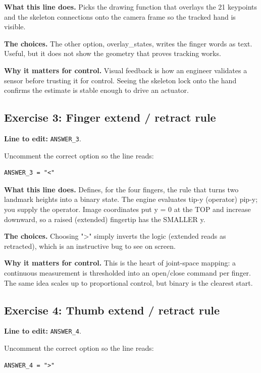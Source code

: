 \documentclass[conference]{IEEEtran}
\begin{document}
\textbf{What this line does.} Picks the drawing function that overlays the 21 keypoints and the skeleton connections onto the camera frame so the tracked hand is visible.

\textbf{The choices.} The other option, overlay\_states, writes the finger words as text. Useful, but it does not show the geometry that proves tracking works.

\textbf{Why it matters for control.} Visual feedback is how an engineer validates a sensor before trusting it for control. Seeing the skeleton lock onto the hand confirms the estimate is stable enough to drive an actuator.

\subsection{Exercise 3: Finger extend / retract rule}

\textbf{Line to edit:} \lstinline!ANSWER_3!.

Uncomment the correct option so the line reads:

\begin{lstlisting}
ANSWER_3 = "<"
\end{lstlisting}


\textbf{What this line does.} Defines, for the four fingers, the rule that turns two landmark heights into a binary state. The engine evaluates tip-y (operator) pip-y; you supply the operator. Image coordinates put y = 0 at the TOP and increase downward, so a raised (extended) fingertip has the SMALLER y.

\textbf{The choices.} Choosing ">" simply inverts the logic (extended reads as retracted), which is an instructive bug to see on screen.

\textbf{Why it matters for control.} This is the heart of joint-space mapping: a continuous measurement is thresholded into an open/close command per finger. The same idea scales up to proportional control, but binary is the clearest start.

\subsection{Exercise 4: Thumb extend / retract rule}

\textbf{Line to edit:} \lstinline!ANSWER_4!.

Uncomment the correct option so the line reads:

\begin{lstlisting}
ANSWER_4 = ">"
\end{lstlisting}
\end{document}
